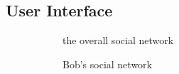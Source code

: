 \documentclass[sigconf,review]{acmart}
\begin{document}
\subsection{User Interface}
\label{sec:user_interface}

\begin{figure}[h]
  \centering
  \hfill
  \begin{subfigure}{0.49\textwidth}
    \caption{the overall social network}
    \label{fig:ui_social_network}
  \end{subfigure}
  \hfill
  \begin{subfigure}{0.49\textwidth}
    \caption{Bob's social network}
    \label{fig:ui_bob}
  \end{subfigure}
  \hfill
  \begin{subfigure}{0.49\textwidth}

\end{subfigure}
\end{figure}
\end{document}
